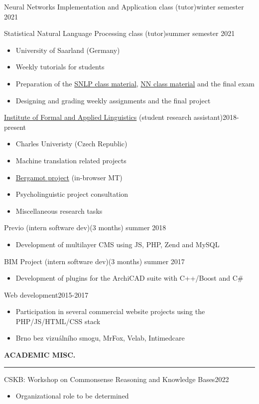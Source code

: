 \documentclass[11pt,a4paper]{article} %
\newcommand{\hSection}[1]{
    \medskip
    \MakeUppercase{\bf #1}
    \medskip
    \hrule
}
\newcommand{\hSubsection}[2]{{#1}\hfill {#2}}
\newcommand{\hSubsectionItemize}[3]{
    {#1}\hfill {\footnotesize #2}\hspace{-1cm}\\
    \vspace{-0.5cm}
    \begin{itemize} \footnotesize #3 \end{itemize}
    \vspace{0.3\baselineskip}
}
\begin{document}
\hSubsection{Neural Networks Implementation and Application class (tutor)}{\footnotesize winter semester 2021 \hspace{-1.3cm}}
\vspace{-0.2cm}

\hSubsectionItemize
{Statistical Natural Language Processing class (tutor)}
{summer semester 2021}
{
    \item University of Saarland (Germany)
    \item Weekly tutorials for students
    \item Preparation of the \href{https://github.com/zouharvi/uds-snlp-tutorial}{SNLP class material}, \href{https://github.com/zouharvi/uds-nn-tutorial}{NN class material} and the final exam
    \item Designing and grading weekly assignments and the final project
}

\hSubsectionItemize
{\href{https://ufal.mff.cuni.cz}{Institute of Formal and Applied Linguistics} (student research assistant)}
{2018-present}
{
    \item Charles Univeristy (Czech Republic)
    \item Machine translation related projects
    \item \href{https://browser.mt/}{Bergamot project} (in-browser MT)
    \item Psycholinguistic project consultation
    \item Miscellaneous research tasks
}

\hSubsectionItemize
{Previo (intern software dev)}
{(3 months) summer 2018}
{
    \item Development of multilayer CMS using JS, PHP, Zend and MySQL
}

\hSubsectionItemize
{BIM Project (intern software dev)}
{(3 months) summer 2017}
{
    \item Development of plugins for the ArchiCAD suite with C++/Boost and C\#
}

\hSubsectionItemize
{Web development}
{2015-2017}
{
\item Participation in several commercial website projects using the PHP/JS/HTML/CSS stack
\item Brno bez vizuálního smogu, MrFox, Velab, Intimedcare 
}


\hSection{Academic Misc.}

\hSubsectionItemize
{CSKB: Workshop on Commonsense Reasoning and Knowledge Bases}
{2022}
{
\item Organizational role to be determined
}
\end{document}
